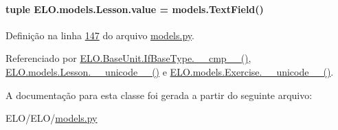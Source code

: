 \hypertarget{classELO_1_1models_1_1Lesson_a27927b9763fb13a9e41b3f826439c600}{
\paragraph[{value}]{\setlength{\rightskip}{0pt plus 5cm}tuple E\-L\-O.\-models.\-Lesson.\-value = models.\-Text\-Field()\hspace{0.3cm}{\ttfamily [static]}}}\label{classELO_1_1models_1_1Lesson_a27927b9763fb13a9e41b3f826439c600}


Definição na linha \hyperlink{ELO_2models_8py_source_l00147}{147} do arquivo \hyperlink{ELO_2models_8py_source}{models.\-py}.



Referenciado por \hyperlink{classELO_1_1BaseUnit_1_1IfBaseType_a69c338f6f1574bd3524e9d59ebc17a7c}{E\-L\-O.\-Base\-Unit.\-If\-Base\-Type.\-\_\-\-\_\-cmp\-\_\-\-\_\-()}, \hyperlink{classELO_1_1models_1_1Lesson_a3d9f0295dbe1ed5c74668d6c0876f97c}{E\-L\-O.\-models.\-Lesson.\-\_\-\-\_\-unicode\-\_\-\-\_\-()} e \hyperlink{classELO_1_1models_1_1Exercise_af3e991e5610cec815a2c3260ec6aae0b}{E\-L\-O.\-models.\-Exercise.\-\_\-\-\_\-unicode\-\_\-\-\_\-()}.



A documentação para esta classe foi gerada a partir do seguinte arquivo\-:\begin{DoxyCompactItemize}
\item 
E\-L\-O/\-E\-L\-O/\hyperlink{ELO_2models_8py}{models.\-py}\end{DoxyCompactItemize}
